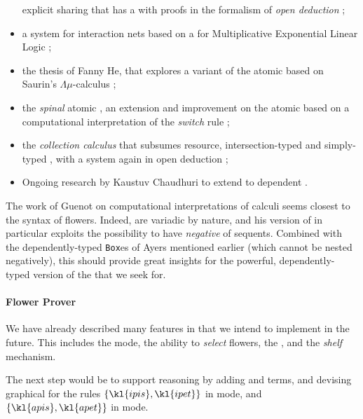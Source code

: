 \begin{scope}
\begin{itemize}
  explicit sharing that has a  with proofs in the
  formalism of \emph{open deduction} ;
  \item a  system for interaction nets based on a  for
  Multiplicative Exponential Linear Logic ;
  \item the thesis of Fanny He, that explores a  variant of the atomic
   based on Saurin's $\Lambda\mu$-calculus
  ;
  \item the \emph{spinal} atomic , an extension and
  improvement on the atomic  based on a computational
  interpretation of the \emph{switch} rule ;
  \item the \emph{collection calculus} that subsumes resource,
  intersection-typed and simply-typed , with a  system
  again in open deduction ;
  \item Ongoing research by Kaustuv Chaudhuri to extend  to
  dependent .
\end{itemize}
The work of Guenot on computational interpretations of  calculi
seems closest to the syntax of flowers. Indeed,  are variadic by
nature, and his version of  in particular exploits the
possibility to have \emph{negative}  of sequents. Combined with the
dependently-typed \texttt{Box}es of Ayers mentioned earlier (which cannot be
nested negatively), this should provide great insights for the powerful,
dependently-typed version of the  that we seek for.

\paragraph{Flower Prover}

We have already described many features in  that we
intend to implement in the future. This includes the  mode, the
ability to \emph{select} flowers, the   , and the
\emph{shelf} mechanism.

The next step would be to support  reasoning by adding  and
 terms, and devising graphical  for the rules $\{\kl{ipis},
\kl{ipet}\}$ in  mode, and $\{\kl{apis}, \kl{apet}\}$ in  mode.


\end{scope}
